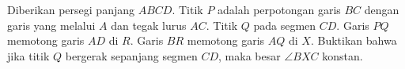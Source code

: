 Diberikan persegi panjang $ABCD$. Titik $P$ adalah perpotongan garis $BC$ dengan garis yang melalui $A$ dan tegak lurus $AC$. Titik $Q$ pada segmen $CD$. Garis $PQ$ memotong garis $AD$ di $R$. Garis $BR$ memotong garis $AQ$ di $X$. Buktikan bahwa jika titik $Q$ bergerak sepanjang segmen $CD$, maka besar $\angle BXC$ konstan.